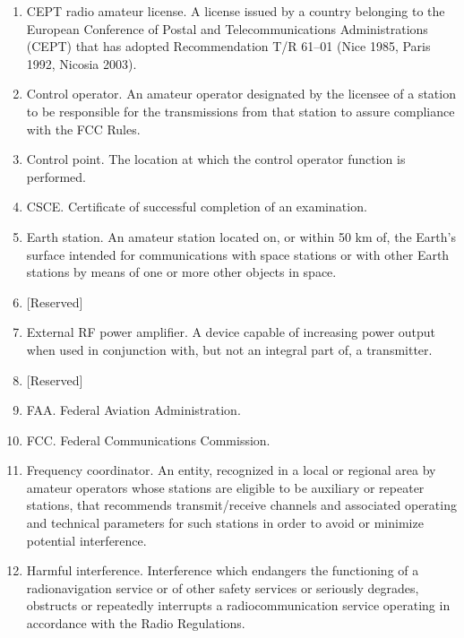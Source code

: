 \documentclass[
  letterpaper,
  DIV=11,
  numbers=noendperiod]{scrreport}
\begin{document}
\begin{enumerate}
\def\labelenumi{(\arabic{enumi})}
\setcounter{enumi}{11}
\item
  CEPT radio amateur license. A license issued by a country belonging to
  the European Conference of Postal and Telecommunications
  Administrations (CEPT) that has adopted Recommendation T/R 61--01
  (Nice 1985, Paris 1992, Nicosia 2003).
\item
  \leavevmode{}%
  Control operator. An amateur operator designated by the licensee of a
  station to be responsible for the transmissions from that station to
  assure compliance with the FCC Rules.
\item
  \leavevmode{}%
  Control point. The location at which the control operator function is
  performed.
\item
  \leavevmode{}%
  CSCE. Certificate of successful completion of an examination.
\item
  \leavevmode{}%
  Earth station. An amateur station located on, or within 50 km of, the
  Earth's surface intended for communications with space stations or
  with other Earth stations by means of one or more other objects in
  space.
\item
  {[}Reserved{]}
\item
  External RF power amplifier. A device capable of increasing power
  output when used in conjunction with, but not an integral part of, a
  transmitter.
\item
  {[}Reserved{]}
\item
  FAA. Federal Aviation Administration.
\item
  FCC. Federal Communications Commission.
\item
  \leavevmode{}%
  Frequency coordinator. An entity, recognized in a local or regional
  area by amateur operators whose stations are eligible to be auxiliary
  or repeater stations, that recommends transmit/receive channels and
  associated operating and technical parameters for such stations in
  order to avoid or minimize potential interference.
\item
  Harmful interference. Interference which endangers the functioning of
  a radionavigation service or of other safety services or seriously
  degrades, obstructs or repeatedly interrupts a radiocommunication
  service operating in accordance with the Radio Regulations.

\end{enumerate}
\end{document}
